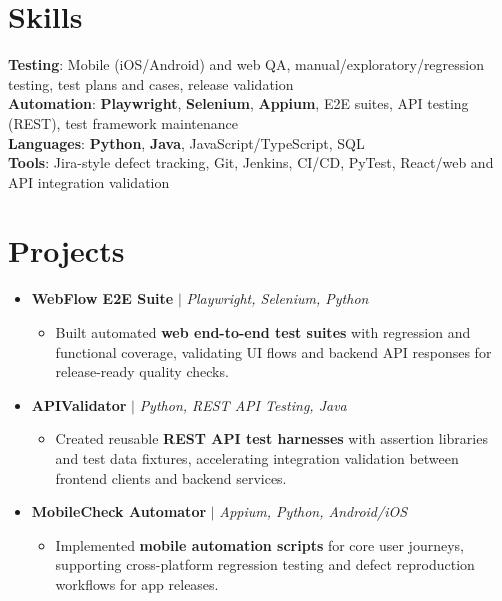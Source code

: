 \documentclass[letterpaper,10pt]{article}
\newcommand{\resumeItem}[1]{\item\small{{#1 \vspace{-2pt}}}}
\newcommand{\resumeProjectHeading}[1]{\item \small #1 \vspace{-2pt}}
\newcommand{\resumeSubHeadingListStart}{\begin{itemize}[leftmargin=0.0in, label={}]}
\newcommand{\resumeSubHeadingListEnd}{\end{itemize}}
\newcommand{\resumeProjItemListStart}{\begin{itemize}[leftmargin=0.15in,label=\textbullet,itemsep=0pt,topsep=0pt,parsep=0pt,partopsep=0pt]}
\newcommand{\resumeProjItemListEnd}{\end{itemize}\vspace{-4pt}}
\begin{document}
\section{Skills}
\begin{itemize}[leftmargin=0.15in, label={}]
\small{\item{
\textbf{Testing}: Mobile (iOS/Android) and web QA, manual/exploratory/regression testing, test plans and cases, release validation \\
\textbf{Automation}: \textbf{Playwright}, \textbf{Selenium}, \textbf{Appium}, E2E suites, API testing (REST), test framework maintenance \\
\textbf{Languages}: \textbf{Python}, \textbf{Java}, JavaScript/TypeScript, SQL \\
\textbf{Tools}: Jira-style defect tracking, Git, Jenkins, CI/CD, PyTest, React/web and API integration validation
}}
\end{itemize}
\vspace{-16pt}
\section{Projects}
\resumeSubHeadingListStart
\vspace{-2pt}
\resumeProjectHeading{\textbf{WebFlow E2E Suite} $|$ \emph{Playwright, Selenium, Python}}
\resumeProjItemListStart
\resumeItem{Built automated \textbf{web end-to-end test suites} with regression and functional coverage, validating UI flows and backend API responses for release-ready quality checks.}
\resumeProjItemListEnd
\vspace{3pt}
\resumeProjectHeading{\textbf{APIValidator} $|$ \emph{Python, REST API Testing, Java}}
\resumeProjItemListStart
\resumeItem{Created reusable \textbf{REST API test harnesses} with assertion libraries and test data fixtures, accelerating integration validation between frontend clients and backend services.}
\resumeProjItemListEnd
\vspace{3pt}
\resumeProjectHeading{\textbf{MobileCheck Automator} $|$ \emph{Appium, Python, Android/iOS}}
\resumeProjItemListStart
\resumeItem{Implemented \textbf{mobile automation scripts} for core user journeys, supporting cross-platform regression testing and defect reproduction workflows for app releases.}
\resumeProjItemListEnd
\resumeSubHeadingListEnd
\end{document}
